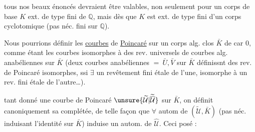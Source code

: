 tous nos beaux énoncés devraient être valables, non seulement pour un corps de base $K$ ext. de type fini de $\mathbb{Q}$, mais dès que $K$ est ext. de type fini d'un corps cyclotomique (pas néc. fini sur $\mathbb{Q}$).

Nous pourrions définir les \uline{courbes} de \uline{Poincaré} sur un corps alg. clos $\bar K$ de car $0$, comme étant les courbes isomorphes à des rev. universels de courbes alg. anabéliennes sur $\bar K$ (deux courbes anabéliennes $=\ \bar U,\bar V$ sur $\bar K$ définissnt des rev. de Poincaré isomorphes, ssi $\exists$ un revêtement fini étale de l'une, isomorphe à un rev. fini étale de l'autre\ldots).

tant donné une courbe de Poincaré $\unsure{\widetilde{\mathcal U}|\widetilde{\overline{\mathcal U}}}$ sur $\bar K$,  on définit canoniquement sa complétée, de telle façon que $\forall$ autom de $(\widetilde{\mathcal U},\bar K)$ (pas néc. induisant l'identité sur $\bar K$) induise un autom. de $\widehat{\mathcal U}$.
Ceci posé :
